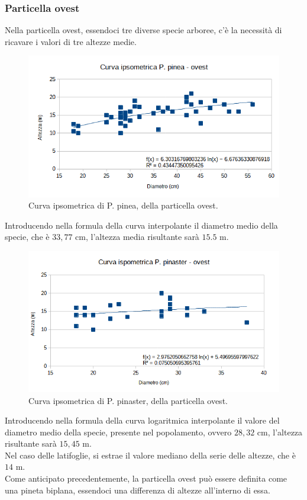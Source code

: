 \subsubsection*{Particella ovest}
Nella particella ovest, essendoci tre diverse specie arboree, c'è la necessità di ricavare i valori di tre altezze medie.\\
\begin{figure}[H]
    \centering
    \includegraphics[width=0.7 \textwidth]{immagini/ipsom_pinea_ovest.png}
    \caption{Curva ipsometrica di P. pinea, della particella ovest.}
    \label{fig:ipsom_pinea_ovest}
\end{figure}
Introducendo nella formula della curva interpolante il diametro medio della specie, che è $33,77$ cm, l'altezza media risultante sarà $15.5$ m.
\begin{figure}[H]
    \centering
    \includegraphics[width=0.7 \textwidth]{immagini/ipsom_pinaster_ovest.png}
    \caption{Curva ipsometrica di P. pinaster, della particella ovest.}
    \label{fig:ipsom_pinaster_ovest}
\end{figure}
Introducendo nella formula della curva logaritmica interpolante il valore del diametro medio della specie, presente nel popolamento, ovvero $28,32$ cm, l'altezza risultante sarà $15,45$ m.\\
Nel caso delle latifoglie, si estrae il valore mediano della serie delle altezze, che è $14$ m.\\
Come anticipato precedentemente, la particella ovest può essere definita come una pineta biplana, essendoci una differenza di altezze all'interno di essa.
